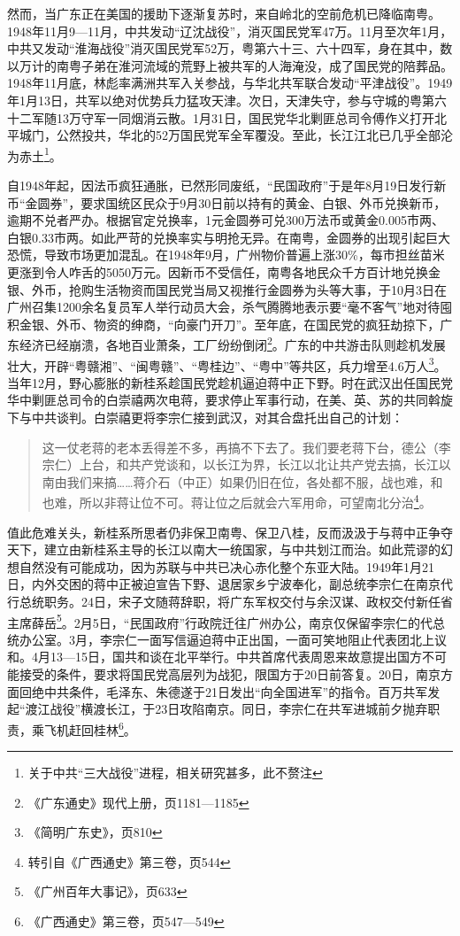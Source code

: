 然而，当广东正在美国的援助下逐渐复苏时，来自岭北的空前危机已降临南粤。1948年11月9—11月，中共发动“辽沈战役”，消灭国民党军47万。11月至次年1月，中共又发动“淮海战役”消灭国民党军52万，粤第六十三、六十四军，身在其中，数以万计的南粤子弟在淮河流域的荒野上被共军的人海淹没，成了国民党的陪葬品。1948年11月底，林彪率满洲共军入关参战，与华北共军联合发动“平津战役”。1949年1月13日，共军以绝对优势兵力猛攻天津。次日，天津失守，参与守城的粤第六十二军随13万守军一同烟消云散。1月31日，国民党华北剿匪总司令傅作义打开北平城门，公然投共，华北的52万国民党军全军覆没。至此，长江江北已几乎全部沦为赤土\footnote{关于中共“三大战役”进程，相关研究甚多，此不赘注}。

自1948年起，因法币疯狂通胀，已然形同废纸，“民国政府”于是年8月19日发行新币“金圆券”，要求国统区民众于9月30日前以持有的黄金、白银、外币兑换新币，逾期不兑者严办。根据官定兑换率，1元金圆券可兑300万法币或黄金0.005市两、白银0.33市两。如此严苛的兑换率实与明抢无异。在南粤，金圆券的出现引起巨大恐慌，导致市场更加混乱。在1948年9月，广州物价普遍上涨30\%，每市担丝苗米更涨到令人咋舌的5050万元。因新币不受信任，南粤各地民众千方百计地兑换金银、外币，抢购生活物资而国民党当局又视推行金圆券为头等大事，于10月3日在广州召集1200余名复员军人举行动员大会，杀气腾腾地表示要“毫不客气”地对待囤积金银、外币、物资的绅商，“向豪门开刀”。至年底，在国民党的疯狂劫掠下，广东经济已经崩溃，各地百业萧条，工厂纷纷倒闭\footnote{《广东通史》现代上册，页1181—1185}。广东的中共游击队则趁机发展壮大，开辟“粤赣湘”、“闽粤赣”、“粤桂边”、“粤中”等共区，兵力增至4.6万人\footnote{《简明广东史》，页810}。当年12月，野心膨胀的新桂系趁国民党趁机逼迫蒋中正下野。时在武汉出任国民党华中剿匪总司令的白崇禧两次电蒋，要求停止军事行动，在美、英、苏的共同斡旋下与中共谈判。白崇禧更将李宗仁接到武汉，对其合盘托出自己的计划：

\begin{quote}

这一仗老蒋的老本丢得差不多，再搞不下去了。我们要老蒋下台，德公（李宗仁）上台，和共产党谈和，以长江为界，长江以北让共产党去搞，长江以南由我们来搞……蒋介石（中正）如果仍旧在位，各处都不服，战也难，和也难，所以非蒋让位不可。蒋让位之后就会六军用命，可望南北分治\footnote{转引自《广西通史》第三卷，页544}。

\end{quote}

值此危难关头，新桂系所思者仍非保卫南粤、保卫八桂，反而汲汲于与蒋中正争夺天下，建立由新桂系主导的长江以南大一统国家，与中共划江而治。如此荒谬的幻想自然没有可能成功，因为苏联与中共已决心赤化整个东亚大陆。1949年1月21日，内外交困的蒋中正被迫宣告下野、退居家乡宁波奉化，副总统李宗仁在南京代行总统职务。24日，宋子文随蒋辞职，将广东军权交付与余汉谋、政权交付新任省主席薛岳\footnote{《广州百年大事记》，页633}。2月5日，“民国政府”行政院迁往广州办公，南京仅保留李宗仁的代总统办公室。3月，李宗仁一面写信逼迫蒋中正出国，一面可笑地阻止代表团北上议和。4月13—15日，国共和谈在北平举行。中共首席代表周恩来故意提出国方不可能接受的条件，要求将国民党高层列为战犯，限国方于20日前答复。20日，南京方面回绝中共条件，毛泽东、朱德遂于21日发出“向全国进军”的指令。百万共军发起“渡江战役”横渡长江，于23日攻陷南京。同日，李宗仁在共军进城前夕抛弃职责，乘飞机赶回桂林\footnote{《广西通史》第三卷，页547—549}。


